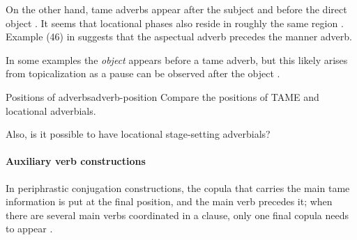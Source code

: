 \documentclass[a4paper, oneside, 12pt]{report}
\newcommand*{\citepage}[1]{p.~{#1}}
\newcommand*{\citepages}[1]{pp.~{#1}}
\begin{document}
On the other hand, \ac{tame} adverbs
appear after the subject and before the direct object
\citep[\citepages{1200-1201,1210}]{jacques2021grammar}.
It seems that locational phases also reside in roughly the same region
\citep[\citepage{302}]{jacques2021grammar}.
Example (46) in \citet[\citepage{1200}]{jacques2021grammar}
suggests that the aspectual adverb precedes the manner adverb.

In some examples the \emph{object} appears before a \ac{tame} adverb,
but this likely arises from topicalization as a pause can be observed after the object
\citep[\citepage{1210}, (82)]{jacques2021grammar}.

\begin{todobox}{Positions of adverbs}{adverb-position}
    Compare the positions of TAME and locational adverbials.
    
    Also, is it possible to have locational stage-setting adverbials?
\end{todobox}

\paragraph*{Auxiliary verb constructions}
In periphrastic conjugation constructions, 
the copula that carries the main \ac{tame} information 
is put at the final position, 
and the main verb precedes it; 
when there are several main verbs coordinated in a clause, 
only one final copula needs to appear \citep[\citepages{1090-1091}]{jacques2021grammar}.
\end{document}
